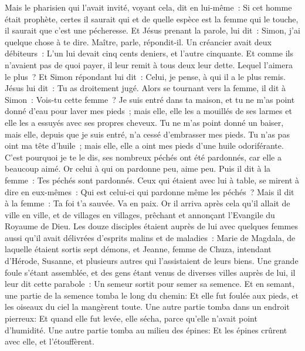 \begin{multicols}{2}
Mais le pharisien qui l'avait invité, voyant cela, dit en lui-même~: Si cet homme était prophète, certes il saurait qui et de quelle espèce est la femme qui le touche, il saurait que c'est une pécheresse.
Et Jésus prenant la parole, lui dit~: Simon, j'ai quelque chose à te dire. Maître, parle, répondit-il.
Un créancier avait deux débiteurs~: L'un lui devait cinq cents deniers, et l'autre cinquante.
Et comme ils n'avaient pas de quoi payer, il leur remit à tous deux leur dette. Lequel l'aimera le plus~?
Et Simon répondant lui dit~: Celui, je pense, à qui il a le plus remis. Jésus lui dit~: Tu as droitement jugé.
Alors se tournant vers la femme, il dit à Simon~: Vois-tu cette femme~? Je suis entré dans ta maison, et tu ne m'as point donné d'eau pour laver mes pieds~; mais elle, elle les a mouillés de ses larmes et elle les a essuyés avec ses propres cheveux.
Tu ne m'as point donné un baiser, mais elle, depuis que je suis entré, n'a cessé d'embrasser mes pieds.
Tu n'as pas oint ma tête d'huile~; mais elle, elle a oint mes pieds d'une huile odoriférante.
C'est pourquoi je te le dis, ses nombreux péchés ont été pardonnés, car elle a beaucoup aimé. Or celui à qui on pardonne peu, aime peu.
Puis il dit à la femme~: Tes péchés sont pardonnés.
Ceux qui étaient avec lui à table, se mirent à dire en eux-mêmes~: Qui est celui-ci qui pardonne même les péchés~?
Mais il dit à la femme~: Ta foi t'a sauvée. Va en paix.
\VerseOne{}Or il arriva après cela qu'il allait de ville en ville, et de villages en villages, prêchant et annonçant l'Evangile du Royaume de Dieu.
Les douze disciples étaient auprès de lui avec quelques femmes aussi qu'il avait délivrées d'esprits malins et de maladies~: Marie de Magdala, de laquelle étaient sortis sept démons,
et Jeanne, femme de Chuza, intendant d'Hérode, Susanne, et plusieurs autres qui l'assistaient de leurs biens.
Une grande foule s'étant assemblée, et des gens étant venus de diverses villes auprès de lui, il leur dit cette parabole~:
Un semeur sortit pour semer sa semence. Et en semant, une partie de la semence tomba le long du chemin: Et elle fut foulée aux pieds, et les oiseaux du ciel la mangèrent toute.
Une autre partie tomba dans un endroit pierreux: Et quand elle fut levée, elle sécha, parce qu'elle n'avait point d'humidité.
Une autre partie tomba au milieu des épines: Et les épines crûrent avec elle, et l'étouffèrent.

\end{multicols}
